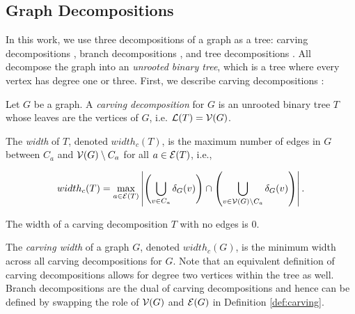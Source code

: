 \subsection{Graph Decompositions}
In this work, we use three decompositions of a graph as a tree: carving decompositions \cite{ST94}, branch decompositions \cite{RS91}, and tree decompositions \cite{RS91}. All decompose the graph into an \emph{unrooted binary tree}, which is a tree where every vertex has degree one or three. First, we describe carving decompositions \cite{ST94}:
\begin{definition}
\label{def:carving}
	Let $G$ be a graph. A \emph{carving decomposition} for $G$ is an unrooted binary tree $T$ whose leaves are the vertices of $G$, i.e. $\mathcal{L}(T) = \mathcal{V}(G)$. 
	
	The \emph{width} of $T$, denoted $width_c(T)$, is the maximum number of edges in $G$ between $C_a$ and $\mathcal{V}(G) \setminus C_a$ for all $a \in \mathcal{E}(T)$, i.e.,
    
	$$width_c(T) = \max_{a \in \mathcal{E}(T)} \left| \left( \bigcup_{v \in C_a} \delta_{G}(v) \right) \cap \left( \bigcup_{v \in \mathcal{V}(G) \setminus C_a} \delta_{G}(v) \right) \right|.$$
	
	
	
	
    The width of a carving decomposition $T$ with no edges is 0.
\end{definition}

The \emph{carving width} of a graph $G$, denoted $width_c(G)$, is the minimum width across all carving decompositions for $G$. Note that an equivalent definition of carving decompositions allows for degree two vertices within the tree as well. 
Branch decompositions are the dual of carving decompositions and hence can be defined by swapping the role of $\mathcal{V}(G)$ and $\mathcal{E}(G)$ in Definition \ref{def:carving}.

